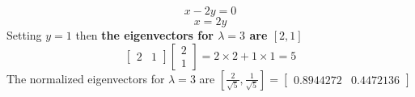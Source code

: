 \documentclass[12pt,a4paper]{paper}
\begin{document}
\begin{enumerate}
\begin{enumerate}
\begin{multicols}{2}
\begin{equation}
\end{equation}
\begin{equation}
x-2y=0
\end{equation}
\begin{equation}
x=2y
\end{equation}
Setting $y = 1$ then \textbf{the eigenvectors for $\lambda = 3$ are $\left[2, 1\right]$}
\begin{equation}
\left[\begin{array}{cc}2 & 1\end{array}\right] \left[\begin{array}{c}2 \\ 1\end{array}\right] = 2 \times 2 + 1 \times 1 = 5
\end{equation}
The normalized eigenvectors for $\lambda = 3$ are $\left[\frac{2}{\sqrt{5}}, \frac{1}{\sqrt{5}}\right] = \left[\begin{array}{cc}0.8944272 & 0.4472136\end{array}\right]$


\end{multicols}
\end{enumerate}
\end{enumerate}
\end{document}
